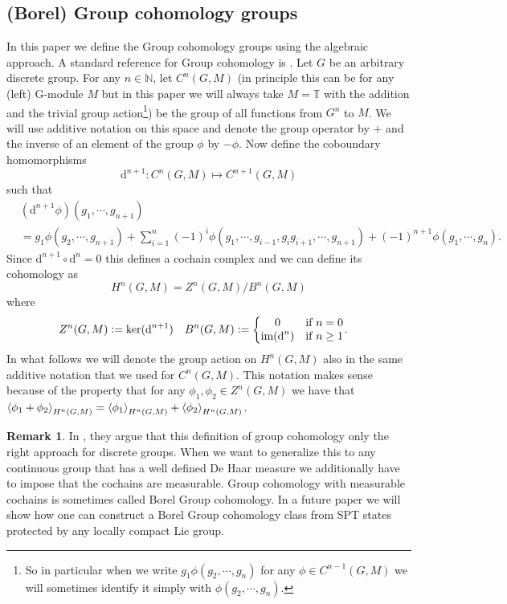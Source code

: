 \documentclass[12pt,a4paper,twoside]{article}
\renewcommand{\d}{\text{d}}
\newcommand{\defeq}{\vcentcolon=}
\let\originalleft\left
\let\originalright\right
\renewcommand{\left}{\mathopen{}\mathclose\bgroup\originalleft}
\renewcommand{\right}{\aftergroup\egroup\originalright}
\newcommand{\TT}{\mathbb T}
\newcommand{\NN}{\mathbb{N}}
\theoremstyle{definition}
\newtheorem{remark}[theorem]{Remark}
\numberwithin{equation}{section}
\begin{document}
\subsection{(Borel) Group cohomology groups}\label{sec:GroupCohomology}
In this paper we define the Group cohomology groups using the algebraic approach. A standard reference for Group cohomology is \cite{benson1991representations}. Let $G$ be an arbitrary discrete group. For any $n\in\NN$, let $C^n(G,M)$ (in principle this can be for any (left) G-module $M$ but in this paper we will always take $M=\TT$ with the addition and the trivial group action\footnote{So in particular when we write $g_1 \phi(g_2,\cdots,g_n)$ for any $\phi\in C^{n-1}(G,M)$ we will sometimes identify it simply with $\phi(g_2,\cdots,g_n)$.}) be the group of all functions from $G^n$ to $M$. We will use additive notation on this space and denote the group operator by $+$ and the inverse of an element of the group $\phi$ by $-\phi$. Now define the coboundary homomorphisms
\begin{equation}
	\d^{n+1}:C^n(G,M)\mapsto C^{n+1}(G,M)
\end{equation}
such that
\begin{align}
	\nonumber
	&(\d^{n+1}\phi)(g_1,\cdots,g_{n+1})\\
	&=g_1\phi(g_2,\cdots,g_{n+1})+\sum_{i=1}^n (-1)^i \phi(g_1,\cdots,g_{i-1},g_{i}g_{i+1},\cdots,g_{n+1})+(-1)^{n+1}\phi(g_1,\cdots,g_n).
\end{align}
Since $\d^{n+1}\circ\d^{n}=0$ this defines a cochain complex and we can define its cohomology as
\begin{equation}
	H^n(G,M)=Z^n(G,M)/B^n(G,M)
\end{equation}
where
\begin{align}
	Z^n(G,M)&\defeq \ker(\d^{n+1})&B^n(G,M)&\defeq \left\{\begin{matrix}
	0&\text{if }n=0\\\textrm{im}(\d^n)&\text{if }n\geq 1
	\end{matrix}\right. .
\end{align}
In what follows we will denote the group action on $H^n(G,M)$ also in the same additive notation that we used for $C^n(G,M)$. This notation makes sense because of the property that for any $\phi_1,\phi_2\in Z^n(G,M)$ we have that $\expval{\phi_1+\phi_2}_{H^n(G,M)}=\expval{\phi_1}_{H^n(G,M)}+\expval{\phi_2}_{H^n(G,M)}$.
\begin{remark}
	In \cite{Chen_2013}, they argue that this definition of group cohomology only the right approach for discrete groups. When we want to generalize this to any continuous group that has a well defined De Haar measure we additionally have to impose that the cochains are measurable. Group cohomology with measurable cochains is sometimes called Borel Group cohomology. In a future paper we will show how one can construct a Borel Group cohomology class from SPT states protected by any locally compact Lie group.
\end{remark}
\end{document}
